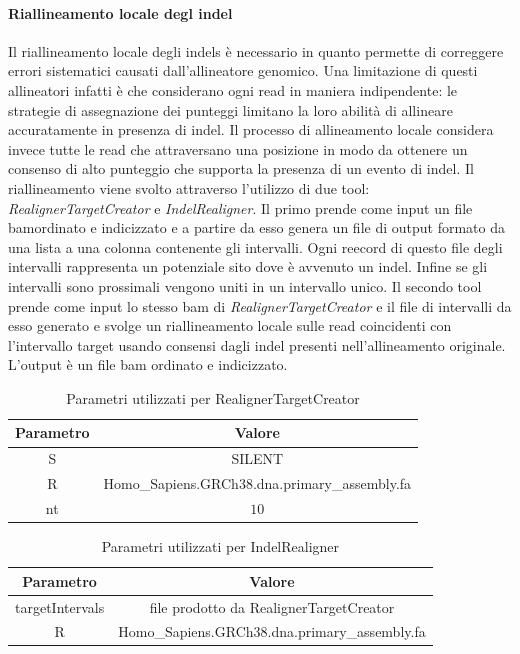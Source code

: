     \paragraph{Riallineamento locale degl indel}
    Il riallineamento locale degli indels \`e necessario in quanto permette di correggere errori sistematici causati dall'allineatore genomico.
    Una limitazione di questi allineatori infatti \`e che considerano ogni read in maniera indipendente: le strategie di assegnazione dei punteggi limitano la loro abilit\`a di allineare accuratamente in presenza di indel.
    Il processo di allineamento locale considera invece tutte le read che attraversano una posizione in modo da ottenere un consenso di alto punteggio che supporta la presenza di un evento di indel.
    Il riallineamento viene svolto attraverso l'utilizzo di due tool: \emph{RealignerTargetCreator} e \emph{IndelRealigner}.
    Il primo prende come input un file bamordinato e indicizzato e a partire da esso genera un file di output formato da una lista a una colonna contenente gli intervalli.
    Ogni reecord di questo file degli intervalli rappresenta un potenziale sito dove \`e avvenuto un indel.
    Infine se gli intervalli sono prossimali vengono uniti in un intervallo unico.
    Il secondo tool prende come input lo stesso bam di \emph{RealignerTargetCreator} e il file di intervalli da esso generato e svolge un riallineamento locale sulle read coincidenti con l'intervallo target usando consensi dagli indel presenti nell'allineamento originale.
    L'output \`e un file bam ordinato e indicizzato.
    \begin{table}[H]
        \centering
        \begin{tabular}{|c|c|}
                \hline
                Parametro & Valore\\
                \hline
                S & SILENT\\
                \hline
                R & Homo\_Sapiens.GRCh38.dna.primary\_assembly.fa\\
                \hline
                nt & $10$\\
                \hline
         \end{tabular}
         \caption{Parametri utilizzati per RealignerTargetCreator}
    \end{table}
                
    \begin{table}[H]
        \centering
        \begin{tabular}{|c|c|}
                \hline
                Parametro & Valore\\
                \hline
                targetIntervals & file prodotto da RealignerTargetCreator\\
                \hline
                R & Homo\_Sapiens.GRCh38.dna.primary\_assembly.fa\\
                \hline
         \end{tabular}
         \caption{Parametri utilizzati per IndelRealigner}
    \end{table}
    

